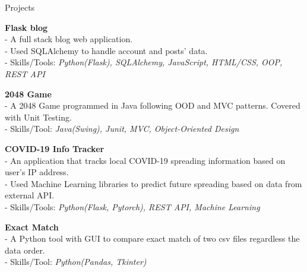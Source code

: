 \documentclass{resume} %
\begin{document}
\begin{rSection}{Projects}

{\bf Flask blog}
\\- A full stack blog web application.
\\- Used SQLAlchemy to handle account and posts' data.
\\- Skills/Tools: \emph{Python(Flask), SQLAlchemy, JavaScript, HTML/CSS, OOP, REST API}

{\bf 2048 Game}
\\- A 2048 Game programmed in Java following OOD and MVC patterns. Covered with Unit Testing.
\\- Skills/Tool: \emph{Java(Swing), Junit, MVC, Object-Oriented Design}

{\bf COVID-19 Info Tracker}
\\- An application that tracks local COVID-19 spreading information based on user's IP address.
\\- Used Machine Learning libraries to predict future spreading based on data from external API.
\\- Skills/Tools: \emph{Python(Flask, Pytorch), REST API, Machine Learning}



{\bf Exact Match}
\\- A Python tool with GUI to compare exact match of two csv files regardless the data order.
\\- Skills/Tool: \emph{Python(Pandas, Tkinter)}

\end{rSection}

\end{document}
